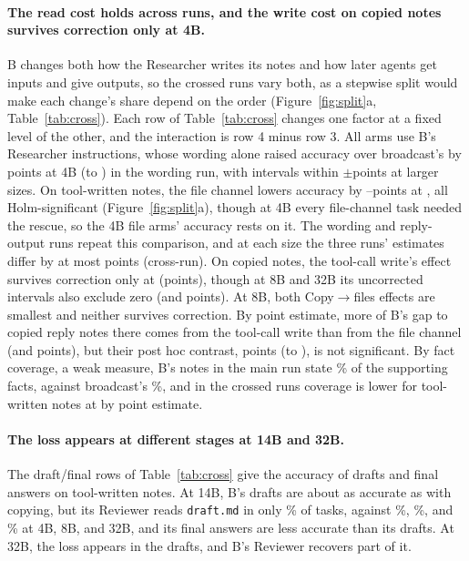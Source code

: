 \documentclass[sigplan,10pt,nonacm,review,anonymous]{acmart}
\begin{document}
\paragraph{The read cost holds across runs, and the write cost on copied notes survives correction only at 4B\@.} B changes both how the
Researcher writes its notes and how later agents get inputs and give outputs, so the crossed runs vary both,
as a stepwise split would make each change's share depend on the order (Figure~\ref{fig:split}a,
Table~\ref{tab:cross}). Each row of Table~\ref{tab:cross} changes one factor at a fixed level of the other,
and the interaction is row 4 minus row 3. All arms use B's Researcher
instructions, whose wording alone raised accuracy over broadcast's by \nRSixFourWording points at 4B
(\nRSixFourWordingLo to \nRSixFourWordingHi) in the wording run, with intervals within
$\pm$\nRSixWordingNullBound points at larger sizes. On tool-written notes, the file channel lowers accuracy by
\nRTenHolmFileToolAbsMin--\nRTenHolmFileToolAbsMax points at \nRTenHolmFileToolSizes, all Holm-significant
(Figure~\ref{fig:split}a), though at 4B every file-channel task needed the rescue, so the 4B file arms' accuracy rests on it.
The wording and reply-output runs repeat this comparison, and at each size the three runs' estimates differ
by at most \nRThirteenReadRepSpreadMax points (cross-run). On copied notes, the tool-call write's effect
survives correction only at \nRTenHolmWriteCopySizes (\nRTenFourWriteCopy points), though at 8B and 32B its
uncorrected intervals also exclude zero (\nRTenEightWriteCopy and \nRTenThirtyTwoWriteCopy points). At 8B, both
Copy$\to$files effects are smallest and neither survives correction. By point estimate, more of B's gap to
copied reply notes there comes from the tool-call write than from the file channel (\nRTenEightWriteCopy and
\nRTenEightFileTool points), but their post hoc contrast, \nRTwelveEightDvw points (\nRTwelveEightDvwLo to
\nRTwelveEightDvwHi), is not significant. By fact coverage, a weak measure, B's notes in the main run state
\nNotesB{}\% of the supporting facts, against broadcast's \nNotesAOne{}\%, and in the crossed runs coverage is
lower for tool-written notes at \nRTenNotesToolLowerSizes by point estimate.

\paragraph{The loss appears at different stages at 14B and 32B\@.} The draft/final rows of
Table~\ref{tab:cross} give the accuracy of drafts and final answers on tool-written notes. At 14B, B's drafts
are about as accurate as with copying, but its Reviewer reads \texttt{draft.md} in only
\nRFourteenRevDraftFourteen{}\% of tasks, against \nRFourteenRevDraftFour{}\%, \nRFourteenRevDraftEight{}\%, and
\nRFourteenRevDraftThirtyTwo{}\% at 4B, 8B, and 32B, and its final answers are less accurate than its drafts.
At 32B, the loss appears in the drafts, and B's Reviewer recovers part of it.
\end{document}
